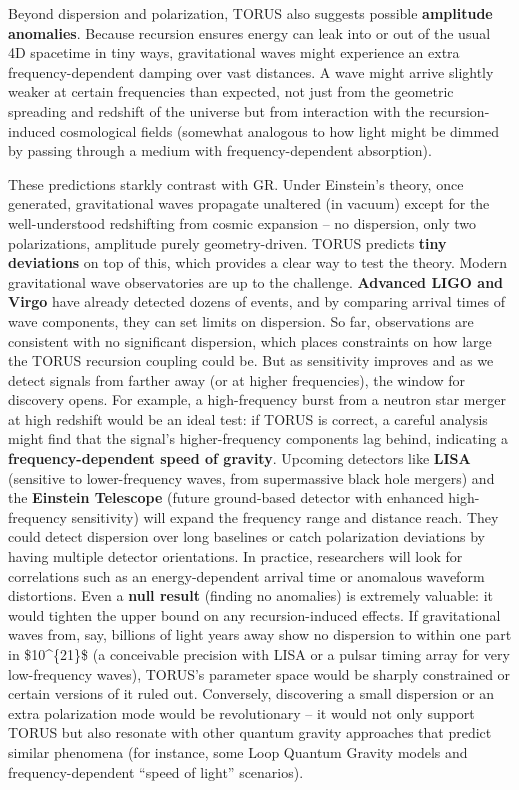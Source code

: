Beyond dispersion and polarization, TORUS also suggests possible
\textbf{amplitude anomalies}. Because recursion ensures energy can leak
into or out of the usual 4D spacetime in tiny ways, gravitational waves
might experience an extra frequency-dependent damping over vast
distances​. A wave might arrive slightly weaker at certain frequencies
than expected, not just from the geometric spreading and redshift of the
universe but from interaction with the recursion-induced cosmological
fields (somewhat analogous to how light might be dimmed by passing
through a medium with frequency-dependent absorption).

These predictions starkly contrast with GR. Under Einstein's theory,
once generated, gravitational waves propagate unaltered (in vacuum)
except for the well-understood redshifting from cosmic expansion -- no
dispersion, only two polarizations, amplitude purely geometry-driven.
TORUS predicts \textbf{tiny deviations} on top of this, which provides a
clear way to test the theory. Modern gravitational wave observatories
are up to the challenge. \textbf{Advanced LIGO and Virgo} have already
detected dozens of events, and by comparing arrival times of wave
components, they can set limits on dispersion. So far, observations are
consistent with no significant dispersion, which places constraints on
how large the TORUS recursion coupling could be. But as sensitivity
improves and as we detect signals from farther away (or at higher
frequencies), the window for discovery opens. For example, a
high-frequency burst from a neutron star merger at high redshift would
be an ideal test: if TORUS is correct, a careful analysis might find
that the signal's higher-frequency components lag behind, indicating a
\textbf{frequency-dependent speed of gravity}​. Upcoming detectors like
\textbf{LISA} (sensitive to lower-frequency waves, from supermassive
black hole mergers) and the \textbf{Einstein Telescope} (future
ground-based detector with enhanced high-frequency sensitivity) will
expand the frequency range and distance reach. They could detect
dispersion over long baselines or catch polarization deviations by
having multiple detector orientations. In practice, researchers will
look for correlations such as an energy-dependent arrival time or
anomalous waveform distortions. Even a \textbf{null result} (finding no
anomalies) is extremely valuable: it would tighten the upper bound on
any recursion-induced effects. If gravitational waves from, say,
billions of light years away show no dispersion to within one part in
\$10\^{}\{21\}\$ (a conceivable precision with LISA or a pulsar timing
array for very low-frequency waves), TORUS's parameter space would be
sharply constrained or certain versions of it ruled out​. Conversely,
discovering a small dispersion or an extra polarization mode would be
revolutionary -- it would not only support TORUS but also resonate with
other quantum gravity approaches that predict similar phenomena (for
instance, some Loop Quantum Gravity models and frequency-dependent
``speed of light'' scenarios)​.

